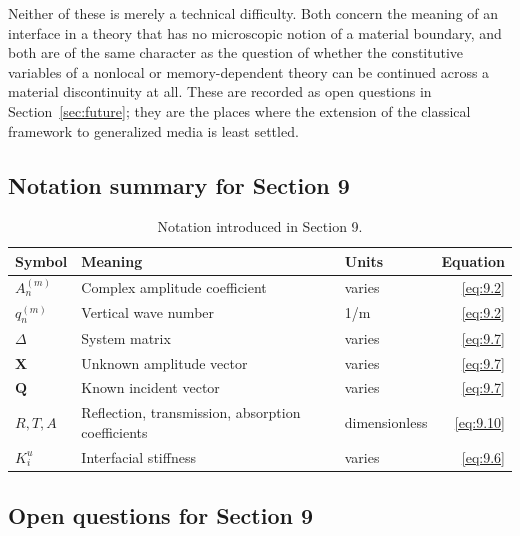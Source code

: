 Neither of these is merely a technical difficulty. Both concern the meaning of an interface in a theory that has no microscopic notion of a material boundary, and both are of the same character as the question of whether the constitutive variables of a nonlocal or memory-dependent theory can be continued across a material discontinuity at all. These are recorded as open questions in Section~\ref{sec:future}; they are the places where the extension of the classical framework to generalized media is least settled.

\subsection{Notation summary for Section 9}

\begin{table}[htbp]
\centering
\small
\caption{Notation introduced in Section 9.}
\label{tab:notation-sec9}
\begin{tabularx}{\textwidth}{@{}lXlr@{}}
\toprule
\textbf{Symbol} & \textbf{Meaning} & \textbf{Units} & \textbf{Equation} \\
\midrule
$A_n^{(m)}$ & Complex amplitude coefficient & varies & \eqref{eq:9.2} \\
$q_n^{(m)}$ & Vertical wave number & 1/m & \eqref{eq:9.2} \\
$\Delta$ & System matrix & varies & \eqref{eq:9.7} \\
$\bm{X}$ & Unknown amplitude vector & varies & \eqref{eq:9.7} \\
$\bm{Q}$ & Known incident vector & varies & \eqref{eq:9.7} \\
$R, T, A$ & Reflection, transmission, absorption coefficients & dimensionless & \eqref{eq:9.10} \\
$K_i^u$ & Interfacial stiffness & varies & \eqref{eq:9.6} \\
\bottomrule
\end{tabularx}
\end{table}

\subsection{Open questions for Section 9}

